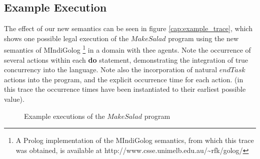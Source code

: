 \subsection{Example Execution}

The effect of our new semantics can be seen in figure \ref{cap:example_trace},
which shows one possible legal execution of the $MakeSalad$ program
using the new semantics of MIndiGolog%
\footnote{A Prolog implementation of the MIndiGolog semantics, from which this
trace was obtained, is available at http://www.csse.unimelb.edu.au/\textasciitilde{}rfk/golog/%
} in a domain with thee agents. Note the occurrence of several actions
within each \textbf{do} statement, demonstrating the integration of
true concurrency into the language. Note also the incorporation of
natural $endTask$ actions into the program, and the explicit occurrence
time for each action. (in this trace the occurrence times have been
instantiated to their earliest possible value).

%
\begin{figure*}[t]
 \centering {} 

\caption{Example executions of the $MakeSalad$ program}

\end{figure*}



